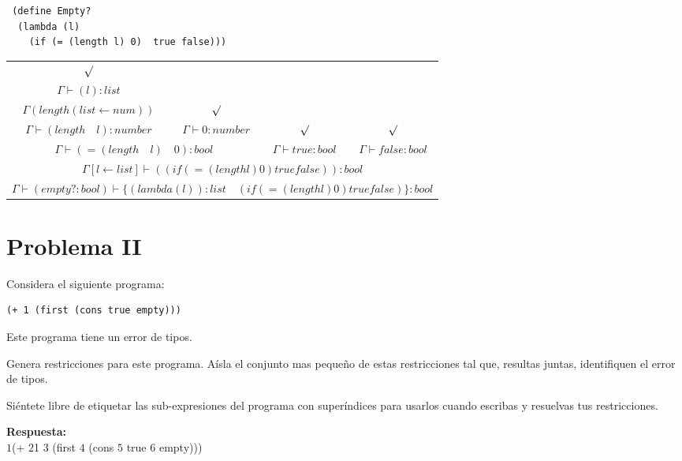 \documentclass{article}
\begin{document}
\begin{lstlisting}
 (define Empty?
  (lambda (l)
    (if (= (length l) 0)  true false)))
\end{lstlisting}

\begin{center}
 \begin{longtable}{c c c c}
 $\surd$ &	&	& \\ \cline{1-1}
 $\Gamma \vdash (l) : list$ &	&  & \\ \cline{1-1}
 $\Gamma (length (list \gets num))$ & $\surd$ & & \\ \cline{1-2}
 $\Gamma \vdash (length  \quad l):number$ & $\Gamma \vdash 0:number$ & $\surd$ & $\surd$ \\ \hline
 \multicolumn{2}{c}{$\Gamma \vdash (=(length  \quad l) \quad 0):bool$} & $\Gamma \vdash true:bool$ & $\Gamma \vdash false:bool$ \\ \hline
 \multicolumn{4}{c}{$\Gamma [l \gets list] \vdash ((if (= (length l) 0)  true false)):bool$} \\ \hline
 \multicolumn{4}{c}{$\Gamma \vdash (empty?:bool) \vdash \{(lambda(l)):list \quad (if (= (length l) 0)  true false)\}:bool$} \\

\end{longtable}

\end{center}

\section*{Problema II}
Considera el siguiente programa:

\begin{verbatim}
(+ 1 (first (cons true empty)))
\end{verbatim}

Este programa tiene un error de tipos.

Genera restricciones para este programa. Aísla el conjunto mas pequeño de
estas restricciones tal que, resultas juntas, identifiquen el error de tipos.

Siéntete libre de etiquetar las sub-expresiones del programa con superíndices
para usarlos cuando escribas y resuelvas tus restricciones.

\textbf {Respuesta: }
\\
$\boxed{1}$(+ $\boxed{2}$1  $\boxed{3}$ (first $\boxed{4}$ (cons $\boxed{5}$ true $\boxed{6}$ empty)))
\end{document}
